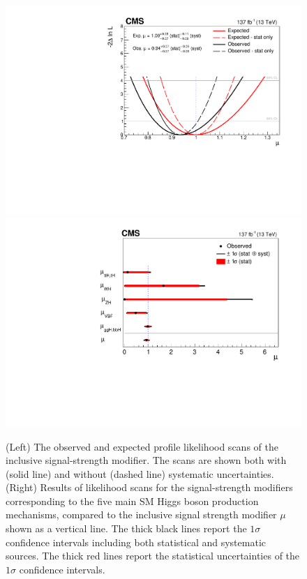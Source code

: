\begin{figure}[!htb]
\begin{center}
\includegraphics[width=0.49\linewidth]{Figures/results/signalstrength/InclusiveMu_125_38.pdf}
\includegraphics[width=0.49\linewidth]{Figures/results/signalstrength/mu_stage0_125_38.pdf}
\caption{
(Left) The observed and expected profile likelihood scans of the inclusive signal-strength modifier. The scans are shown both with (solid line) and without (dashed line) systematic uncertainties.
(Right) Results of likelihood scans for the signal-strength modifiers corresponding to the five main SM Higgs boson production mechanisms, compared to the inclusive signal strength modifier  $\mu$ shown as a vertical line.
The thick black lines report the $1\sigma$ confidence intervals including both statistical and systematic sources.
The thick red lines report the statistical uncertainties of the $1\sigma$ confidence intervals.
\label{fig:mucat}}
\end{center}
\end{figure}

